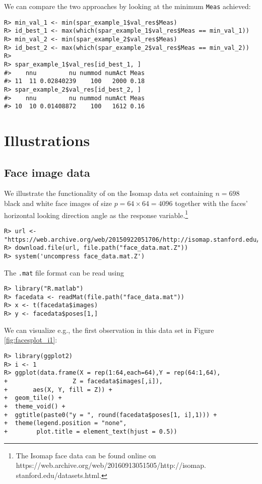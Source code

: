 \documentclass[
  article]{jss}
\begin{document}
We can compare the two approaches by looking at the minimum
\texttt{Meas} achieved:

\begin{verbatim}
R> min_val_1 <- min(spar_example_1$val_res$Meas)
R> id_best_1 <- max(which(spar_example_1$val_res$Meas == min_val_1))
R> min_val_2 <- min(spar_example_2$val_res$Meas)
R> id_best_2 <- max(which(spar_example_2$val_res$Meas == min_val_2))
R> 
R> spar_example_1$val_res[id_best_1, ]
#>    nnu         nu nummod numAct Meas
#> 11  11 0.02840239    100   2000 0.18
R> spar_example_2$val_res[id_best_2, ]
#>    nnu         nu nummod numAct Meas
#> 10  10 0.01408872    100   1612 0.16
\end{verbatim}

\section{Illustrations}\label{sec-illustrations}

\subsection{Face image data}\label{face-image-data}

We illustrate the functionality of  on the Isomap data set
containing \(n = 698\) black and white face images of size
\(p = 64 \times 64 = 4096\) together with the faces' horizontal looking
direction angle as the response variable.\footnote{
The Isomap face data can be found online on https://web.archive.org/web/20160913051505/http://isomap.
stanford.edu/datasets.html.}

\begin{verbatim}
R> url <- "https://web.archive.org/web/20150922051706/http://isomap.stanford.edu/face_data.mat.Z"
R> download.file(url, file.path("face_data.mat.Z"))
R> system('uncompress face_data.mat.Z')
\end{verbatim}

The \texttt{.mat} file format can be read using 
\citep{pkg:rmatlab}

\begin{verbatim}
R> library("R.matlab")
R> facedata <- readMat(file.path("face_data.mat"))
R> x <- t(facedata$images)
R> y <- facedata$poses[1,]
\end{verbatim}

We can visualize e.g., the first observation in this data set in Figure
\ref{fig:facesplot_i1}:

\begin{verbatim}
R> library(ggplot2)
R> i <- 1
R> ggplot(data.frame(X = rep(1:64,each=64),Y = rep(64:1,64),
+                  Z = facedata$images[,i]),
+       aes(X, Y, fill = Z)) +
+  geom_tile() +
+  theme_void() +
+  ggtitle(paste0("y = ", round(facedata$poses[1, i],1))) +
+  theme(legend.position = "none",
+        plot.title = element_text(hjust = 0.5))
\end{verbatim}
\end{document}
